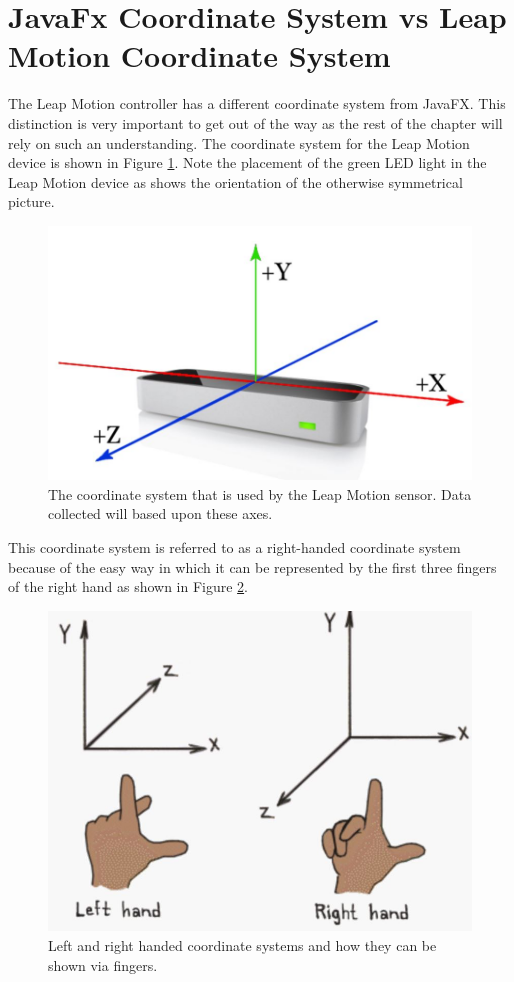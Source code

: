\section{JavaFx Coordinate System vs Leap Motion Coordinate System}
The Leap Motion controller has a different coordinate system from JavaFX. This distinction is very important to get out of the way as the rest of the chapter will rely on such an understanding. The coordinate system for the Leap Motion device is shown in Figure \ref{fig:leapcs}. Note the placement of the green LED light in the Leap Motion device as shows the orientation of the otherwise symmetrical picture.
\begin{figure}[H]
\centering
\includegraphics[scale=0.35]{Figures/4_leapCS.JPG}
\caption[Leap Motion Coordinate System]{The coordinate system that is used by the Leap Motion sensor. Data collected will based upon these axes.}
\label{fig:leapcs}
\end{figure}

This coordinate system is referred to as a right-handed coordinate system because of the easy way in which it can be represented by the first three fingers of the right hand as shown in Figure \ref{fig:lhcsRhcs}. 
\begin{figure}[H]
\centering
\includegraphics[scale=0.35]{Figures/4_lhrhCS.JPG}
\caption[Left vs Right Hand Coordinate System]{Left and right handed coordinate systems and how they can be shown via fingers.}
\label{fig:lhcsRhcs}
\end{figure}

